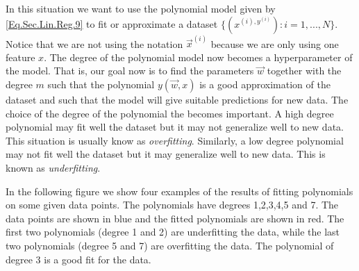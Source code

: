 In this situation we want to use the polynomial model given by \cref{Eq.Sec.Lin.Reg.9} to fit or approximate a dataset $\{ (x^{(i), y^{(i)}}) : i=1,...,N \}$. Notice that we are not using the notation $\vec{x}^{(i)}$ because we are only using one feature $x$. The degree of the polynomial model now becomes a hyperparameter of the model. That is, our goal now is to find the parameters $\vec{w}$ together with the degree $m$ such that the polynomial $y(\vec{w},x)$ is a good approximation of the dataset and such that the model will give suitable predictions for new data. The choice of the degree of the polynomial the becomes important. A high degree polynomial may fit well the dataset but it may not generalize well to new data. This situation is usually know as \emph{overfitting}. Similarly, a low degree polynomial may not fit well the dataset but it may generalize well to new data. This is known as \emph{underfitting}.  

In the following figure we show four examples of the results of fitting polynomials  on some given data points. The polynomials have degrees 1,2,3,4,5 and 7. The data points are shown in blue and the fitted polynomials are shown in red. The first two polynomials (degree 1 and 2) are underfitting the data, while the last two polynomials (degree 5 and 7) are overfitting the data. The polynomial of degree 3 is a good fit for the data. 

